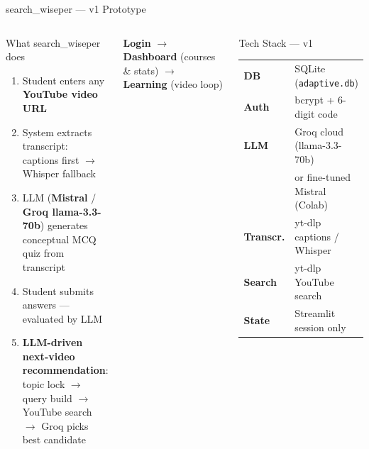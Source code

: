 \documentclass[aspectratio=169,9pt]{beamer}
\begin{document}
\begin{frame}{search\_wiseper — v1 Prototype}
\begin{columns}[T]
  \begin{block}{What search\_wiseper does}
    \begin{enumerate}
      \item Student enters any \textbf{YouTube video URL}
      \item System extracts transcript:\\
        \textcolor{success}{captions first} $\to$ \textcolor{warning}{Whisper fallback}
      \item LLM (\textbf{Mistral} / \textbf{Groq llama-3.3-70b}) generates\\
        conceptual MCQ quiz from transcript
      \item Student submits answers — evaluated by LLM
      \item \textbf{LLM-driven next-video recommendation}:\\
        topic lock $\to$ query build $\to$ YouTube search\\
        $\to$ Groq picks best candidate
    \end{enumerate}
  \end{block}

  \begin{keybox}[title={3-page Streamlit App}]
    \small
    \textbf{Login} $\to$ \textbf{Dashboard} (courses \& stats) $\to$ \textbf{Learning} (video loop)
  \end{keybox}

  \begin{block}{Tech Stack — v1}
    \small
    \begin{tabular}{ll}
      \textbf{DB}       & SQLite (\texttt{adaptive.db}) \\
      \textbf{Auth}     & bcrypt + 6-digit code \\
      \textbf{LLM}      & Groq cloud (llama-3.3-70b) \\
                        & or fine-tuned Mistral (Colab) \\
      \textbf{Transcr.} & yt-dlp captions / Whisper \\
      \textbf{Search}   & yt-dlp YouTube search \\
      \textbf{State}    & Streamlit session only \\
    \end{tabular}
  \end{block}


\end{columns}
\end{frame}
\end{document}
